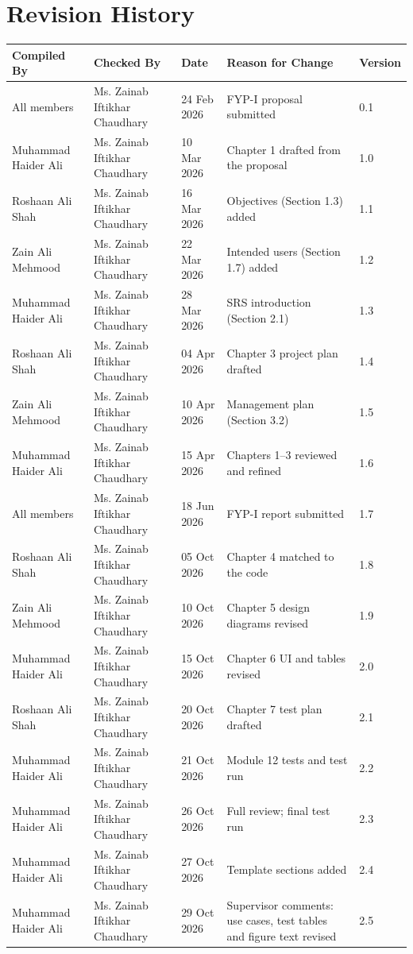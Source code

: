 \chapter*{Revision History}

\begin{center}
\footnotesize
\setlength{\tabcolsep}{4pt}
\renewcommand{\arraystretch}{1.2}
\begin{tabularx}{\textwidth}{l l l >{\raggedright\arraybackslash}X l}
\hline\hline
\textbf{Compiled By} & \textbf{Checked By} & \textbf{Date} & \textbf{Reason for Change} & \textbf{Version} \\
\hline
All members & Ms. Zainab Iftikhar Chaudhary & 24 Feb 2026 & FYP-I proposal submitted & 0.1 \\
Muhammad Haider Ali & Ms. Zainab Iftikhar Chaudhary & 10 Mar 2026 & Chapter 1 drafted from the proposal & 1.0 \\
Roshaan Ali Shah & Ms. Zainab Iftikhar Chaudhary & 16 Mar 2026 & Objectives (Section 1.3) added & 1.1 \\
Zain Ali Mehmood & Ms. Zainab Iftikhar Chaudhary & 22 Mar 2026 & Intended users (Section 1.7) added & 1.2 \\
Muhammad Haider Ali & Ms. Zainab Iftikhar Chaudhary & 28 Mar 2026 & SRS introduction (Section 2.1) & 1.3 \\
Roshaan Ali Shah & Ms. Zainab Iftikhar Chaudhary & 04 Apr 2026 & Chapter 3 project plan drafted & 1.4 \\
Zain Ali Mehmood & Ms. Zainab Iftikhar Chaudhary & 10 Apr 2026 & Management plan (Section 3.2) & 1.5 \\
Muhammad Haider Ali & Ms. Zainab Iftikhar Chaudhary & 15 Apr 2026 & Chapters 1--3 reviewed and refined & 1.6 \\
All members & Ms. Zainab Iftikhar Chaudhary & 18 Jun 2026 & FYP-I report submitted & 1.7 \\
Roshaan Ali Shah & Ms. Zainab Iftikhar Chaudhary & 05 Oct 2026 & Chapter 4 matched to the code & 1.8 \\
Zain Ali Mehmood & Ms. Zainab Iftikhar Chaudhary & 10 Oct 2026 & Chapter 5 design diagrams revised & 1.9 \\
Muhammad Haider Ali & Ms. Zainab Iftikhar Chaudhary & 15 Oct 2026 & Chapter 6 UI and tables revised & 2.0 \\
Roshaan Ali Shah & Ms. Zainab Iftikhar Chaudhary & 20 Oct 2026 & Chapter 7 test plan drafted & 2.1 \\
Muhammad Haider Ali & Ms. Zainab Iftikhar Chaudhary & 21 Oct 2026 & Module 12 tests and test run & 2.2 \\
Muhammad Haider Ali & Ms. Zainab Iftikhar Chaudhary & 26 Oct 2026 & Full review; final test run & 2.3 \\
Muhammad Haider Ali & Ms. Zainab Iftikhar Chaudhary & 27 Oct 2026 & Template sections added & 2.4 \\
Muhammad Haider Ali & Ms. Zainab Iftikhar Chaudhary & 29 Oct 2026 & Supervisor comments: use cases, test tables and figure text revised & 2.5 \\
\hline\hline
\end{tabularx}
\end{center}
